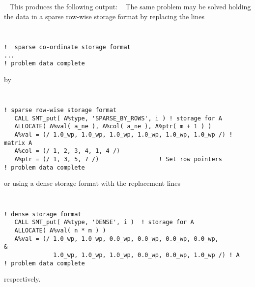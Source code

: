 \documentclass{galahad}
\begin{document}
{\tt \small
\VerbatimInput{\packageexample}
}
\noindent
This produces the following output:
{\tt \small
\VerbatimInput{\packageresults}
}
\noindent
The same problem may be solved holding the data in
a sparse row-wise storage format by replacing the lines
{\tt \small
\begin{verbatim}
!  sparse co-ordinate storage format
...
! problem data complete
\end{verbatim}
}
\noindent
by
{\tt \small
\begin{verbatim}
! sparse row-wise storage format
   CALL SMT_put( A%type, 'SPARSE_BY_ROWS', i ) ! storage for A
   ALLOCATE( A%val( a_ne ), A%col( a_ne ), A%ptr( m + 1 ) )
   A%val = (/ 1.0_wp, 1.0_wp, 1.0_wp, 1.0_wp, 1.0_wp, 1.0_wp /) ! matrix A
   A%col = (/ 1, 2, 3, 4, 1, 4 /)
   A%ptr = (/ 1, 3, 5, 7 /)                 ! Set row pointers
! problem data complete
\end{verbatim}
}
\noindent
or using a dense storage format with the replacement lines
{\tt \small
\begin{verbatim}
! dense storage format
   CALL SMT_put( A%type, 'DENSE', i )  ! storage for A
   ALLOCATE( A%val( n * m ) )
   A%val = (/ 1.0_wp, 1.0_wp, 0.0_wp, 0.0_wp, 0.0_wp, 0.0_wp,          &
              1.0_wp, 1.0_wp, 1.0_wp, 0.0_wp, 0.0_wp, 1.0_wp /) ! A
! problem data complete
\end{verbatim}
}
\noindent
respectively.
\end{document}
